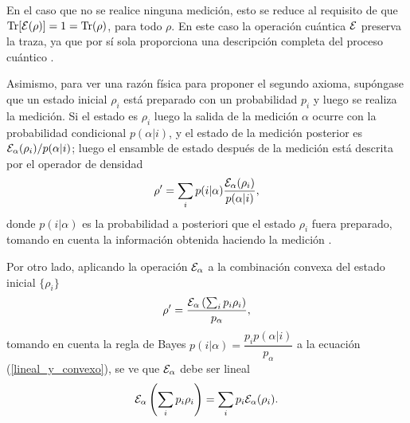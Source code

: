 En el caso que no se realice ninguna medición, esto se reduce al requisito de
que ${\rm Tr}[\mathcal{E}(\rho)] = 1 = {\rm Tr}(\rho)$, para todo $\rho$. En este caso la
operación cuántica $\mathcal{E}$ preserva la traza, ya que por sí sola proporciona una
descripción completa del proceso cuántico 
{\cite{nielsen_chuang_2010}}.

\begin{comment}
Asimismo, una razón física para proponer el segundo axioma, es que se espera que la evolución de un estado cuántico sea lineal debido a que de esa forma es compatible con la interpretación del operador de densidad como un ensamble de posibles estados. Supóngase que $\E$ mapea al estado inicial $\rho$  en el tiempo $t=0$ al estado final al tiempo $t=T$, el estado $\rho_i$ es preparado con una probabilidad $p_i$. Luego el estado de evolución temporal en $t = T$ será $\E(\rho_i )$ con probabilidad $p_i$, por lo tanto el estado final $\rho'$ evoluciona como \begin{equation}
\rho'= \sum_i p_i \E (\rho_i).
\end{equation}

Por otro lado, el estado inicial es descrito por $\sum_i p_i \rho$, que evoluciona así 
\begin{equation}
    \rho'= \E\left(\sum_i p_i \rho_i\right).
\end{equation} Igualando las dos ecuaciones anteriores, se tiene  que $\E$ debe actuar linealmente, en combinaciones convexas de estados {\cite{preskill2020quantum}}.
\end{comment}

Asimismo, para ver una razón física para proponer el segundo axioma, supóngase que un estado inicial $\rho_i$ está preparado con un probabilidad $p_i$ y luego se realiza la medición. Si el estado es $\rho_i $ luego la salida de la medición  $\alpha$ ocurre con la probabilidad condicional $p(\alpha|i)$, y el estado de la medición  posterior es $\mathcal{E}_\alpha(\rho_i)/p(\alpha|i)$; luego el ensamble de estado después de la medición está descrita por el operador de densidad 
\begin{equation}\label{lineal_y_convexo}
    \rho'=\sum_i p(i|\alpha)\dfrac{\mathcal{E}_\alpha(\rho_i)}{p(\alpha|i)},
\end{equation}
donde $p(i|\alpha)$ es la probabilidad a posteriori que el estado $\rho_i$
fuera preparado, tomando en cuenta la información obtenida haciendo la medición
{\cite{preskill2020quantum}}. 

Por otro lado, aplicando la operación $\mathcal{E}_\alpha$  a la combinación convexa del
estado inicial $\{\rho_i\}$ \begin{equation}
    \rho'=\dfrac{\mathcal{E}_\alpha\left(\sum_i p_i \rho_i\right)}{p_\alpha},
\end{equation} tomando en cuenta la regla de Bayes  $p(i|\alpha)=\dfrac{p_i
p(\alpha|i)}{ p_\alpha} $ a la ecuación ({\ref{lineal_y_convexo}}),  se ve que
$\mathcal{E}_\alpha$ debe ser lineal {\cite{preskill2020quantum}} 
\begin{equation}
    \mathcal{E}_\alpha\left(\sum_i p_i \rho_i\right)=\sum_i p_i\mathcal{E}_\alpha(\rho_i). 
\end{equation}

